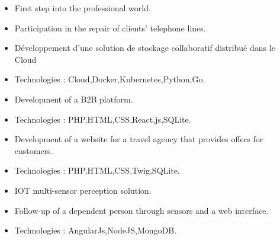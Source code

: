 
\begin{itemize}
\item First step into the professional world.
\item Participation in the repair of clients' telephone lines.
\end{itemize}


\begin{itemize}
\item Développement d'une solution de stockage collaboratif distribué dans le Cloud
\item Technologies : Cloud,Docker,Kubernetes,Python,Go.
\end{itemize}

\divider

\begin{itemize}
\item Development of a B2B platform.
\item Technologies : PHP,HTML,CSS,React.js,SQLite.
\end{itemize}

\divider

\begin{itemize}
\item Development of a website for a travel agency that provides offers for customers.
\item Technologies : PHP,HTML,CSS,Twig,SQLite.
\end{itemize}

\divider

\begin{itemize}
\item IOT multi-sensor perception solution.
\item Follow-up of a dependent person through sensors and a web interface.
\item Technologies : AngularJs,NodeJS,MongoDB.
\end{itemize}



